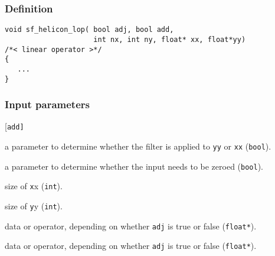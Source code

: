 \subsubsection*{Definition}
\begin{verbatim}
void sf_helicon_lop( bool adj, bool add, 
                     int nx, int ny, float* xx, float*yy) 
/*< linear operator >*/
{
   ...
}
\end{verbatim}

\subsubsection*{Input parameters}
\begin{desclist}{\tt }{\quad}[\tt add]
   \setlength\itemsep{0pt}
   \item[adj] a parameter to determine whether the filter is applied to \texttt{yy} or \texttt{xx} (\texttt{bool}).
   \item[add] a parameter to determine whether the input needs to be zeroed (\texttt{bool}).
   \item[nx]  size of \texttt{x}x (\texttt{int}).
   \item[ny]  size of \texttt{y}y (\texttt{int}).
   \item[xx]  data or operator, depending on whether \texttt{adj} is true or false (\texttt{float*}).
   \item[yy]  data or operator, depending on whether \texttt{adj} is true or false (\texttt{float*}).
\end{desclist}

